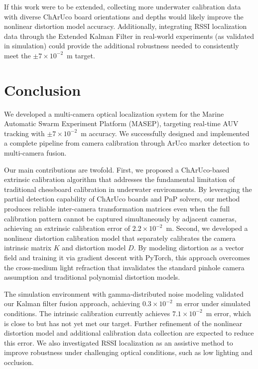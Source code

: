 \documentclass[11pt]{article}
\begin{document}
        If this work were to be extended, collecting more underwater calibration data with diverse ChArUco board orientations and depths would likely improve the nonlinear distortion model accuracy. Additionally, integrating RSSI localization data through the Extended Kalman Filter in real-world experiments (as validated in simulation) could provide the additional robustness needed to consistently meet the $\pm7\times10^{-2}$~m target.

\section{Conclusion}
We developed a multi-camera optical localization system for the Marine Automatic Swarm Experiment Platform (MASEP), targeting real-time AUV tracking with $\pm 7\times 10^{-2}$~m accuracy. We successfully designed and implemented a complete pipeline from camera calibration through ArUco marker detection to multi-camera fusion.

Our main contributions are twofold. First, we proposed a ChArUco-based extrinsic calibration algorithm that addresses the fundamental limitation of traditional chessboard calibration in underwater environments. By leveraging the partial detection capability of ChArUco boards and PnP solvers, our method produces reliable inter-camera transformation matrices even when the full calibration pattern cannot be captured simultaneously by adjacent cameras, achieving an extrinsic calibration error of $2.2\times 10^{-2}$~m. Second, we developed a nonlinear distortion calibration model that separately calibrates the camera intrinsic matrix $K$ and distortion model $D$. By modeling distortion as a vector field and training it via gradient descent with PyTorch, this approach overcomes the cross-medium light refraction that invalidates the standard pinhole camera assumption and traditional polynomial distortion models.

The simulation environment with gamma-distributed noise modeling validated our Kalman filter fusion approach, achieving $0.3\times 10^{-2}$~m error under simulated conditions. The intrinsic calibration currently achieves $7.1\times 10^{-2}$~m error, which is close to but has not yet met our target. Further refinement of the nonlinear distortion model and additional calibration data collection are expected to reduce this error. We also investigated RSSI localization as an assistive method to improve robustness under challenging optical conditions, such as low lighting and occlusion.
\end{document}
